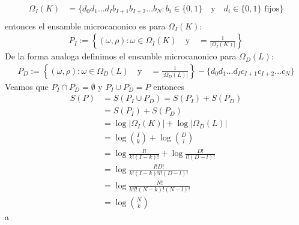 \begin{answer}
\begin{align*}
        \Omega_I(K) &= \{d_0d_1\dots d_Ib_{I+1}b_{I+2}\dots b_N: b_i \in \{0,1\} \quad \text{y} \quad d_i \in \{0,1\} \text{ fijos}\}\\
    \end{align*}
    entonces el ensamble microcanonico es para $\Omega_I(K)$:
    \begin{align*}
        P_I := \left\{ \left(\omega, \rho \right): \omega \in \Omega_I(K)  \quad \text{y} \quad = \frac{1}{|\Omega_I(K)|}\right\}
    \end{align*}
    De la forma analoga definimos el ensamble microcanonico para $\Omega_D(L)$:
    \begin{align*}
        P_D := \left\{ \left(\omega, \rho \right): \omega \in \Omega_D(L)  \quad \text{y} \quad = \frac{1}{|\Omega_D(L)|}\right\} - \{d_0d_1\dots d_Ic_{I+1}c_{I+2}\dots c_N\}
    \end{align*}
    Veamos que $P_I \cap P_D = \emptyset$ y $P_I \cup P_D = P$ entonces
    \begin{align*}
        S(P) &= S(P_I \cup P_D) = S(P_I) + S(P_D)\\
        &= S(P_I) + S(P_D)\\
        &= \log |\Omega_I(K)| + \log |\Omega_D(L)|\\
        &= \log \binom{I}{k} + \log \binom{D}{l}\\
        &= \log \frac{I!}{k!(I-k)!} + \log \frac{D!}{l!(D-l)!}\\
        &= \log \frac{I!D!}{k!(I-k)!l!(D-l)!}\\
        &= \log \frac{N!}{k!l!(N-k)!(N-l)!}\\
        &= \log \binom{N}{k}
    \end{align*}a
\end{answer}